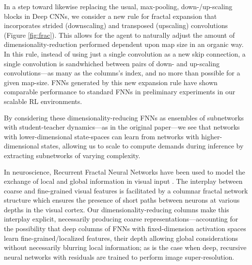 \documentclass{article}
\begin{document}
In a step toward likewise replacing the usual, max-pooling, down-/up-scaling blocks in Deep CNNs, we consider a new rule for fractal expansion that incorporates strided (downscaling) and transposed (upscaling) convolutions (Figure \ref{fig:frac}).
This allows for the agent to naturally adjust the amount of dimensionality-reduction performed dependent upon map size in an organic way.
In this rule, instead of using just a single convolution as a new skip connection, a single convolution is sandwhiched between pairs of down- and up-scaling convolutions---as many as the columns's index, and no more than possible for a given map-size.
FNNs generated by this new expansion rule have shown comparable performance to standard FNNs in preliminary experiments in our scalable RL environments.


By considering these dimensionality-reducing FNNs as ensembles of subnetworks with student-teacher dynamics---as in the original paper---we see that networks with lower-dimensional state-spaces can learn from networks with higher-dimensional states, allowing us to scale to compute demands during inference by extracting subnetworks of varying complexity.  

In neuroscience, Recurrent Fractal Neural Networks have been used to model the exchange of local and global information in visual input \cite{bieberich2002recurrent}. 
The interplay between coarse and fine-grained visual features is facilitated by a columnar fractal network structure which ensures the presence of short paths between neurons at various depths in the visual cortex. 
Our dimensionality-reducing columns make this interplay explicit, necessarily producing coarse representations---accounting for the possibility that deep columns of FNNs with fixed-dimension activation spaces learn fine-grained/localized features, their depth allowing global considerations without necessarily blurring local information; as is the case when deep, recursive neural networks \cite{kim2016deeply} with residuals \cite{tai2017image} are trained to perform image super-resolution.
\end{document}
